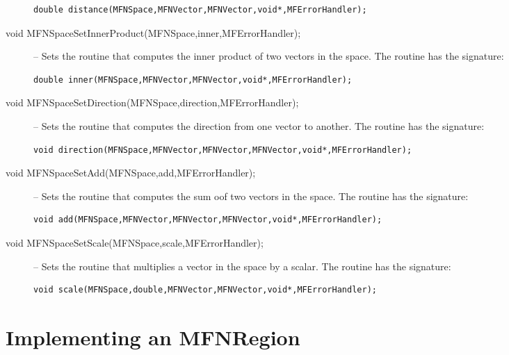 \documentclass[12pt]{article}
\begin{document}
\begin{description}
\begin{center}
\begin{verbatim}
double distance(MFNSpace,MFNVector,MFNVector,void*,MFErrorHandler);
\end{verbatim}
\end{center}
\item [void MFNSpaceSetInnerProduct(MFNSpace,inner,MFErrorHandler);]
-- Sets the routine that computes the inner product of two vectors in the space. The
routine has the signature:
\begin{center}
\begin{verbatim}
double inner(MFNSpace,MFNVector,MFNVector,void*,MFErrorHandler);
\end{verbatim}
\end{center}
\item [void MFNSpaceSetDirection(MFNSpace,direction,MFErrorHandler);]
-- Sets the routine that computes the direction from one vector to another. The
routine has the signature:
\begin{center}
\begin{verbatim}
void direction(MFNSpace,MFNVector,MFNVector,MFNVector,void*,MFErrorHandler);
\end{verbatim}
\end{center}
\item [void MFNSpaceSetAdd(MFNSpace,add,MFErrorHandler);]
-- Sets the routine that computes the sum oof two vectors in the space. The
routine has the signature:
\begin{center}
\begin{verbatim}
void add(MFNSpace,MFNVector,MFNVector,MFNVector,void*,MFErrorHandler);
\end{verbatim}
\end{center}
\item [void MFNSpaceSetScale(MFNSpace,scale,MFErrorHandler);]
-- Sets the routine that multiplies a vector in the space by a scalar. The
routine has the signature:
\begin{center}
\begin{verbatim}
void scale(MFNSpace,double,MFNVector,MFNVector,void*,MFErrorHandler);
\end{verbatim}
\end{center}
\end{description}

\section{Implementing an MFNRegion}
\end{document}
